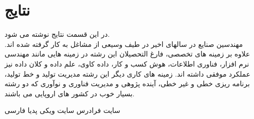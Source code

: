 \documentclass[12pt,onecolumn,a4paper]{article}
\begin{document}
\section{نتایج}
در این قسمت نتایج نوشته می شود.\\
مهندسین صنایع در سالهای اخیر در طیف وسیعی از مشاغل به کار گرفته شده اند. علاوه بر زمینه های تخصصی، فارغ التحصیلان این رشته در
زمینه هایی مانند مهندسی نرم افزار، فناوری اطلاعات، هوش کسب و کار، داده کاوی، علم داده و کلان داده نیز عملکرد موفقی داشته اند. زمینه های
کاری دیگر این رشته مدیریت تولید و خط تولید، برنامه ریزی خطی و غیر خطی، آینده پژوهی و مدیریت فناوری و نوآوری که دو رشته بسیار خوب
در کشور های اروپایی می باشند.

\begin{thebibliography}{99}
\bibitem{}
سایت فرادرس
\bibitem{}
سایت ویکی پدیا فارسی




\end{thebibliography}
\end{document}
